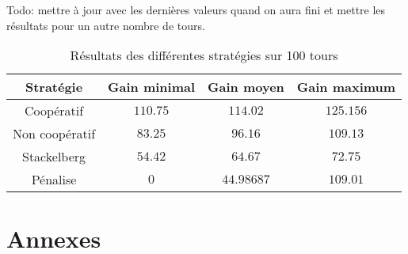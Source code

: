 \documentclass{scrartcl}
\begin{document}
    Todo: mettre à jour avec les dernières valeurs quand on aura fini et mettre
    les résultats pour un autre nombre de tours.
    \begin{table}[h]
      \centering
      \begin{tabular}{|c||c|c|c|}
        \hline
        Stratégie      & Gain minimal & Gain moyen & Gain maximum \\\hline\hline
        Coopératif     & $110.75$     & $114.02$   & $125.156$    \\\hline
        Non coopératif & $83.25$      & $96.16$    & $109.13$     \\\hline
        Stackelberg    & $54.42$      & $64.67$    & $72.75$      \\\hline
        Pénalise       & $0$          & $44.98687$ & $109.01$     \\\hline
      \end{tabular}
      \caption{Résultats des différentes stratégies sur 100 tours}
      \label{table:coop_results}
    \end{table}
    
\pagebreak[4] %
\section{Annexes}
  
  
  
  
  
  
  
\end{document}
